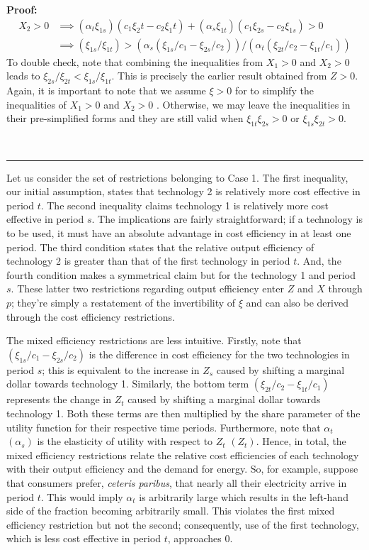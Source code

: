 \documentclass[11pt,a4paper]{extarticle}
\newenvironment{proof}[1][Proof]{\noindent\textbf{#1:} }{\ \rule{0.5em}{0.5em}}
\begin{document}
\begin{proof}
	\begin{align*}
	X_2 > 0 &\implies (\alpha_t \xi_{1s})(c_1 \xi_2t - c_2\xi_1t) + (\alpha_s \xi_{1t})(c_1 \xi_{2s} - c_2 \xi_{1s}) > 0\\
	&\implies (\xi_{1s}/\xi_{1t}) > (\alpha_s (\xi_{1s}/c_1 -  \xi_{2s}/c_2))/(\alpha_t(\xi_{2t}/c_2 - \xi_{1t}/c_1)) 
	\end{align*}
	To double check, note that combining the inequalities from $X_1>0$ and $X_2 > 0$ leads to $\xi_{2s}/\xi_{2t} < \xi_{1s}/\xi_{1t}$. This is precisely the earlier result obtained from $Z > 0$. Again, it is  important to note that we assume $\xi > 0$ for to simplify the inequalities of $X_1 > 0$ and $X_2 > 0$ . Otherwise, we may leave the inequalities in their pre-simplified forms and they are still valid when  $\xi_{1t} \xi_{2s} > 0$ or $\xi_{1s} \xi_{2t} > 0$.   \\ \hfill
	
\end{proof}

Let us consider the set of restrictions belonging to Case 1. The first inequality, our initial assumption, states that technology 2 is relatively more cost effective in period $t$. The second inequality claims technology 1 is relatively more cost effective in period $s$. The implications are fairly straightforward; if a technology is to be used, it must have an absolute advantage in cost efficiency in at least one period. The third condition states that the relative output efficiency of technology 2 is greater than that of the first technology in period $t$. And, the fourth condition makes a symmetrical claim but for the technology 1 and period $s$. These latter two restrictions regarding output efficiency enter $Z$ and $X$ through $p$; they're simply a restatement of the invertibility of $\xi$ and can also be derived through the cost efficiency restrictions. 

The mixed efficiency restrictions are less intuitive. Firstly, note that $\left(\xi_{1s}/c_1 - \xi_{2s}/c_2\right)$ is the difference in cost efficiency for the two technologies in period $s$; this is equivalent to the increase in $Z_s$ caused by shifting a marginal dollar towards technology 1. Similarly, the bottom term $\left( \xi_{2t}/c_2 - \xi_{1t}/c_1 \right)$ represents the change in $Z_t$ caused by shifting a marginal dollar towards technology 1. Both these terms are then multiplied by the share parameter of the utility function for their respective time periods. Furthermore, note that $\alpha_t$ $(\alpha_s)$ is the elasticity of utility with respect to $Z_t$ $(Z_t)$. Hence, in total, the mixed efficiency restrictions relate the relative cost efficiencies of each technology with their output efficiency and the demand for energy. So, for example, suppose that consumers prefer, \textit{ceteris paribus}, that nearly all their electricity arrive in period $t$. This would imply $\alpha_t$ is arbitrarily large which results in the left-hand side of the fraction becoming arbitrarily small. This violates the first mixed efficiency restriction but not the second; consequently, use of the first technology, which is less cost effective in period $t$, approaches $0$. 
\end{document}

